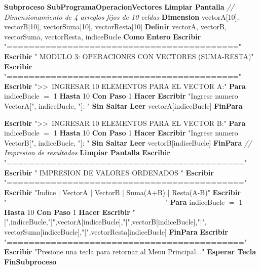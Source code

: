 \documentclass[12pt,a4paper]{article}
\newcommand{\kw}[1]{\textcolor{pseKeyword}{\textbf{#1}}}
\newcommand{\txt}[1]{\textcolor{pseString}{"#1"}}
\newcommand{\num}[1]{\textcolor{pseNumber}{#1}}
\newcommand{\cmt}[1]{\textcolor{pseComment}{\textit{// #1}}}
\newcommand{\opAsig}{\textcolor{pseKeyword}{$=$}}
\newcommand{\Escribir}[1]{\kw{Escribir} #1}
\newcommand{\EscribirSS}[1]{\kw{Escribir} #1 \kw{Sin Saltar}}
\newcommand{\Leer}[1]{\kw{Leer} #1}
\newcommand{\Definir}[2]{\kw{Definir} #1 \kw{Como} \kw{#2}}
\newcommand{\Para}[4]{\kw{Para} #1 \opAsig{} \num{#2} \kw{Hasta} \num{#3} \kw{Con Paso} \num{#4} \kw{Hacer}}
\newcommand{\FinPara}{\kw{FinPara}}
\newcommand{\Subproceso}[1]{\kw{Subproceso} \textbf{#1}}
\newcommand{\FinSubproceso}{\kw{FinSubproceso}}
\newcommand{\Dimension}[1]{\kw{Dimension} #1}
\newcommand{\I}{\hspace{1.5em}}
\newcommand{\II}{\hspace{3.0em}}
\begin{document}
\begin{algorithmic}[1]
	\State \Subproceso{SubProgramaOperacionVectores}
	\State \I \kw{Limpiar Pantalla}
	\State \I \cmt{Dimensionamiento de 4 arreglos fijos de 10 celdas}
	\State \I \Dimension{vectorA[\num{10}], vectorB[\num{10}], vectorSuma[\num{10}], vectorResta[\num{10}]}
	\State \I \Definir{vectorA, vectorB, vectorSuma, vectorResta, indiceBucle}{Entero}
	\State
	\State \I \Escribir{\txt{==========================================}}
	\State \I \Escribir{\txt{ MODULO 3: OPERACIONES CON VECTORES (SUMA-RESTA)}}
	\State \I \Escribir{\txt{==========================================}}
	\State
	\State
	\State \I \Escribir{\txt{\textgreater\textgreater\ INGRESAR 10 ELEMENTOS PARA EL VECTOR A:}}
	\State \I \Para{indiceBucle}{1}{10}{1}
	\State \II \EscribirSS{\txt{Ingrese numero VectorA[}, indiceBucle, \txt{]: }}
	\State \II \Leer{vectorA[indiceBucle]}
	\State \I \FinPara
	
	\State
	\State \I \Escribir{\txt{\textgreater\textgreater\ INGRESAR 10 ELEMENTOS PARA EL VECTOR B:}}
	\State \I \Para{indiceBucle}{1}{10}{1}
	\State \II \EscribirSS{\txt{Ingrese numero VectorB[}, indiceBucle, \txt{]: }}
	\State \II \Leer{vectorB[indiceBucle]}
	\State \I \FinPara
	\State \I \cmt{Impresion de resultados}
	\State \I \kw{Limpiar Pantalla}
	\State \I \Escribir{\txt{===========================================}}
	\State \I \Escribir{\txt{        IMPRESION DE VALORES ORDENADOS }}
	\State \I \Escribir{\txt{===========================================}}
	\State \I \Escribir{\txt{Indice | VectorA | VectorB | Suma(A+B) | Resta(A-B)}}
	\State \I \Escribir{\txt{-------------------------------------------------------------------}}
	\State \I \Para{indiceBucle}{1}{10}{1}
	\State \II \Escribir{\txt{[},indiceBucle,\txt{]},vectorA[indiceBucle],\txt{|},vectorB[indiceBucle],\txt{|},
		vectorSuma[indiceBucle],\txt{|},vectorResta[indiceBucle]}
	\State \I \FinPara
	\State \I \Escribir{\txt{===========================================}}
	\State \I \Escribir{\txt{Presione una tecla para retornar al Menu Principal...}}
	\State \I \kw{Esperar Tecla}
	\State \FinSubproceso
	

\end{algorithmic}
\end{document}
